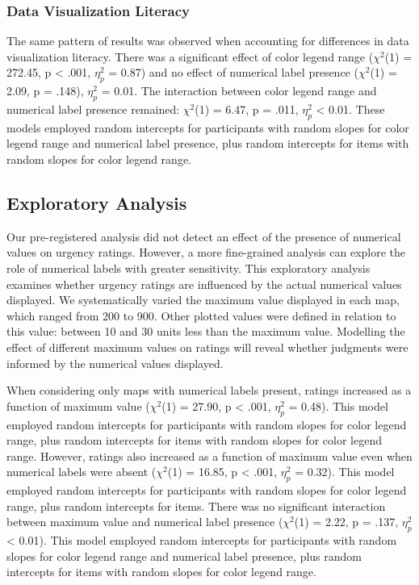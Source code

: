 \documentclass[
]{interact}
\begin{document}
\hypertarget{data-visualization-literacy-1}{%
\subsubsection{Data Visualization
Literacy}\label{data-visualization-literacy-1}}

The same pattern of results was observed when accounting for differences
in data visualization literacy. There was a significant effect of color
legend range (\(\chi^2\)(1) = 272.45, p \textless{} .001, \(\eta_p^2\) =
0.87) and no effect of numerical label presence (\(\chi^2\)(1) = 2.09, p
= .148), \(\eta_p^2\) = 0.01. The interaction between color legend range
and numerical label presence remained: \(\chi^2\)(1) = 6.47, p = .011,
\(\eta_p^2\) \textless{} 0.01. These models employed random intercepts
for participants with random slopes for color legend range and numerical
label presence, plus random intercepts for items with random slopes for
color legend range.

\hypertarget{exploratory-analysis}{%
\subsection{Exploratory Analysis}\label{exploratory-analysis}}

Our pre-registered analysis did not detect an effect of the presence of
numerical values on urgency ratings. However, a more fine-grained
analysis can explore the role of numerical labels with greater
sensitivity. This exploratory analysis examines whether urgency ratings
are influenced by the actual numerical values displayed. We
systematically varied the maximum value displayed in each map, which
ranged from 200 to 900. Other plotted values were defined in relation to
this value: between 10 and 30 units less than the maximum value.
Modelling the effect of different maximum values on ratings will reveal
whether judgments were informed by the numerical values displayed.

When considering only maps with numerical labels present, ratings
increased as a function of maximum value (\(\chi^2\)(1) = 27.90, p
\textless{} .001, \(\eta_p^2\) = 0.48). This model employed random
intercepts for participants with random slopes for color legend range,
plus random intercepts for items with random slopes for color legend
range. However, ratings also increased as a function of maximum value
even when numerical labels were absent (\(\chi^2\)(1) = 16.85, p
\textless{} .001, \(\eta_p^2\) = 0.32). This model employed random
intercepts for participants with random slopes for color legend range,
plus random intercepts for items. There was no significant interaction
between maximum value and numerical label presence (\(\chi^2\)(1) =
2.22, p = .137, \(\eta_p^2\) \textless{} 0.01). This model employed
random intercepts for participants with random slopes for color legend
range and numerical label presence, plus random intercepts for items
with random slopes for color legend range.
\end{document}
